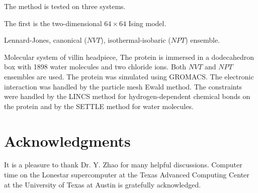 \documentclass[aip,jcp,preprint,superscriptaddress]{revtex4-1}
\begin{document}
The method is tested on three systems.


The first is the two-dimensional $64\times64$ Ising model.


Lennard-Jones, canonical ($NVT$), isothermal-isobaric ($NPT$) ensemble.



Molecular system of villin headpiece,
The protein is immersed in
a dodecahedron box with 1898 water molecules and two chloride ions.
%
Both $NVT$ and $NPT$ ensembles are used.
%
The protein was simulated
using GROMACS\cite{
  berendsen1995, *lindahl2001, *vanderspoel2005, *hess2008}.
%
The electronic interaction was
handled by the particle mesh Ewald method\cite{
  essmann1995}.
%
The constraints were handled by the LINCS method\cite{
  hess1997}
for hydrogen-dependent chemical bonds on the protein
and by the SETTLE method\cite{
  miyamoto1992}
for water molecules.





\section{Acknowledgments}



It is a pleasure to thank Dr. Y. Zhao
for many helpful discussions.
%
Computer time on the Lonestar supercomputer
at the Texas Advanced Computing Center
at the University of Texas at Austin
is gratefully acknowledged.




\end{document}
